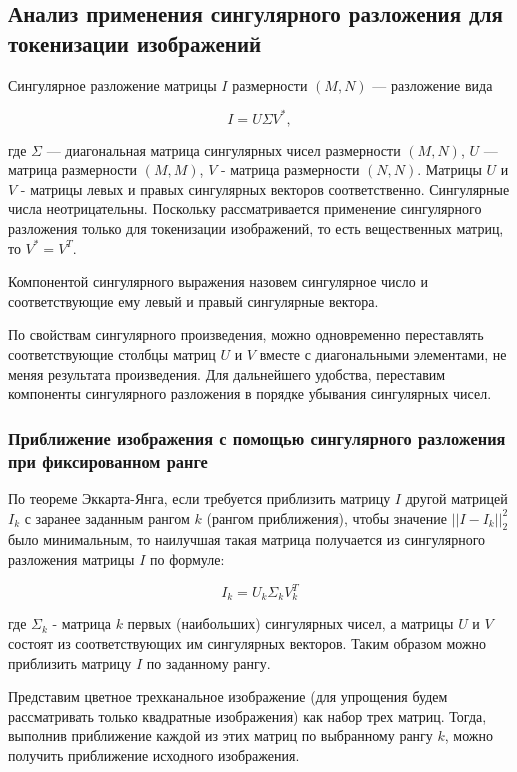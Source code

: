 \documentclass[times,specification,annotation]{itmo-student-thesis}
\begin{document}
\subsection{Анализ применения сингулярного разложения для токенизации изображений}

Сингулярное разложение \cite{loginov_svd} матрицы $I$ размерности $(M, N)$ --- разложение вида 

$$
I = U\Sigma V^*,
$$

где $\Sigma$ --- диагональная матрица сингулярных чисел размерности $(M, N)$, $U$ --- матрица размерности $(M, M)$, $V$ - матрица размерности $(N, N)$. Матрицы $U$ и $V$ - матрицы левых и правых сингулярных векторов соответственно. Сингулярные числа неотрицательны. Поскольку рассматривается применение сингулярного разложения только для токенизации изображений, то есть вещественных матриц, то $V^* = V^T$.

Компонентой сингулярного выражения назовем сингулярное число и соответствующие ему левый и правый сингулярные вектора.

По свойствам сингулярного произведения, можно одновременно переставлять соответствующие столбцы матриц $U$ и $V$ вместе с диагональными элементами, не меняя результата произведения. Для дальнейшего удобства, переставим компоненты сингулярного разложения в порядке убывания сингулярных чисел.

\subsubsection{Приближение изображения с помощью сингулярного разложения при фиксированном ранге}

По теореме Эккарта-Янга\cite{eckart_young}, если требуется приблизить матрицу $I$ другой матрицей $I_k$ с заранее заданным рангом $k$ (рангом приближения), чтобы значение $||I - I_k||_2^2$ было минимальным, то наилучшая такая матрица получается из сингулярного разложения матрицы $I$ по формуле:

$$
I_k = U_k\Sigma_kV_k^T
$$

где $\Sigma_k$ - матрица $k$ первых (наибольших) сингулярных чисел, а матрицы $U$ и $V$ состоят из соответствующих им сингулярных векторов. Таким образом можно приблизить матрицу $I$ по заданному рангу. 

Представим цветное трехканальное изображение (для упрощения будем рассматривать только квадратные изображения) как набор трех матриц. Тогда, выполнив приближение каждой из этих матриц по выбранному рангу $k$, можно получить приближение исходного изображения.
\end{document}
